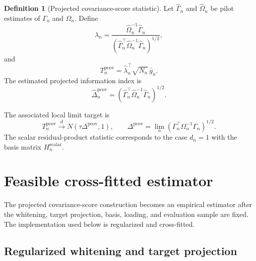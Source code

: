 \documentclass[11pt,a4paper]{amsart}
\theoremstyle{plain}
\theoremstyle{definition}
\newtheorem{definition}[theorem]{Definition}
\theoremstyle{remark}
\newcommand{\toD}{\xrightarrow{d}}
\begin{document}
\begin{definition}[Projected covariance-score statistic]\label{def:projected-score}
Let \(\widehat\Gamma_n\) and \(\widehat\Omega_n\) be pilot estimates of \(\Gamma_n\) and \(\Omega_n\).
Define
\[
        \widehat\lambda_n
        =
        \frac{
        \widehat\Omega_n^{-1}\widehat\Gamma_n
        }{
        \left(
        \widehat\Gamma_n^\top
        \widehat\Omega_n^{-1}
        \widehat\Gamma_n
        \right)^{1/2}
        },
\]
and
\[
        T_n^{\mathrm{pcov}}
        =
        \widehat\lambda_n^\top
        \sqrt{N_n}\,\bar g_n.
\]
The estimated projected information index is
\[
        \widehat\Delta_n^{\mathrm{pcov}}
        =
        \left(
        \widehat\Gamma_n^\top
        \widehat\Omega_n^{-1}
        \widehat\Gamma_n
        \right)^{1/2}.
\]
\end{definition}

The associated local limit target is
\[
        T_n^{\mathrm{pcov}}
        \toD
        N(\tau\Delta^{\mathrm{pcov}},1),
        \qquad
        \Delta^{\mathrm{pcov}}
        =
        \lim_n
        \left(
        \Gamma_n^\top\Omega_n^{-1}\Gamma_n
        \right)^{1/2}.
\]
The scalar residual-product statistic corresponds to the case \(d_n=1\) with the basis matrix
\(H_n^{\mathrm{scalar}}\).

\section{Feasible cross-fitted estimator}\label{sec:definitive-estimator}

The projected covariance-score construction becomes an empirical estimator after the whitening,
target projection, basis, loading, and evaluation sample are fixed.  The implementation used below
is regularized and cross-fitted.

\subsection{Regularized whitening and target projection}
\end{document}
